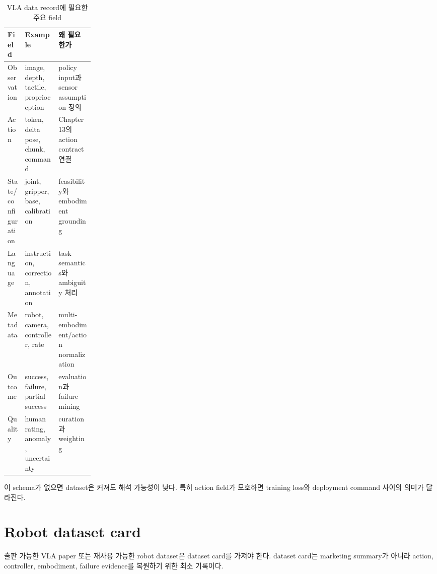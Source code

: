 \begin{table}[h]
  \centering
  \caption{VLA data record에 필요한 주요 field}
  \begin{tabularx}{\linewidth}{p{0.2\linewidth}X X}
    \toprule
    Field & Example & 왜 필요한가 \\
    \midrule
    Observation & image, depth, tactile, proprioception & policy input과 sensor assumption 정의 \\
    Action & token, delta pose, chunk, command & Chapter 13의 action contract 연결 \\
    State/configuration & joint, gripper, base, calibration & feasibility와 embodiment grounding \\
    Language & instruction, correction, annotation & task semantics와 ambiguity 처리 \\
    Metadata & robot, camera, controller, rate & multi-embodiment/action normalization \\
    Outcome & success, failure, partial success & evaluation과 failure mining \\
    Quality & human rating, anomaly, uncertainty & curation과 weighting \\
    \bottomrule
  \end{tabularx}
  \label{tab:ch14-record-schema}
\end{table}

이 schema가 없으면 dataset은 커져도 해석 가능성이 낮다. 특히 action field가 모호하면 training loss와 deployment command 사이의 의미가 달라진다.

\section{Robot dataset card}

출판 가능한 VLA paper 또는 재사용 가능한 robot dataset은 dataset card를 가져야 한다. dataset card는 marketing summary가 아니라 action, controller, embodiment, failure evidence를 복원하기 위한 최소 기록이다.

